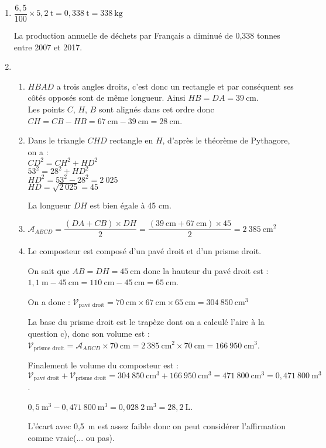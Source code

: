 
\begin{enumerate}[itemsep=1em]
	\item $\dfrac{6,5}{100}\times5,2~\text{t} = 0,338~\text{t} = 338~\text{kg}$
	
	\medskip
	La production annuelle de déchets par Français a diminué de 0,338 tonnes entre 2007 et 2017.
	
	\item 
	
	\begin{enumerate}[itemsep=1em]
	  	\item $HBAD$ a trois angles droits, c'est donc un rectangle et par conséquent ses côtés opposés sont de même longueur. Ainsi $HB = DA = 39~\text{cm}$.\\
	  	      Les points $C$, $H$, $B$ sont alignés dans cet ordre donc $CH=CB-HB=67~\text{cm}-39~\text{cm}=28~\text{cm}$.
	  	
	  	\item Dans le triangle $CHD$ rectangle en $H$, d'après le théorème de Pythagore, on a : \\
	  	      $CD^2=CH^2+HD^2$\\
	  	      $53^2=28^2+HD^2$\\
	  	      $HD^2=53^2-28^2=2~025$\\
	  	      $HD=\sqrt{2~025}=45$
	  	     
	  	      \medskip
	  	      La longueur $DH$ est bien égale à 45 cm.
	  	
	  	\item $\mathcal{A}_{ABCD}=\dfrac{(DA+CB)\times DH}{2}= \dfrac{(39~\text{cm}+67~\text{cm})\times45}{2}=2~385~\text{cm}^2$
	  	
	  	\item Le composteur est composé d'un pavé droit et d'un prisme droit.
	  	
	  	\medskip
	  	On sait que $AB=DH=45~\text{cm}$ donc la hauteur du pavé droit est :\\ $1,1~\text{m}-45~\text{cm}=110~\text{cm}-45~\text{cm}=65~\text{cm}$.
	  	
	  	\medskip
	  	On a donc : $\mathcal{V}_\text{pavé droit}=70~\text{cm}\times67~\text{cm}\times65~\text{cm}=304~850~\text{cm}^3$
	  	
	  	\medskip
	  	La base du prisme droit est le trapèze dont on a calculé l'aire à la question c), donc son volume est : $\mathcal{V}_\text{prisme droit}=\mathcal{A}_{ABCD}\times70~\text{cm}=2~385~\text{cm}^2\times70~\text{cm}=166~950~\text{cm}^3$.
	  	
	  	\medskip
	  	Finalement le volume du composteur est :\\ $\mathcal{V}_\text{pavé droit}+\mathcal{V}_\text{prisme droit} = 304~850~\text{cm}^3 + 166~950~\text{cm}^3 = 471~800~\text{cm}^3= 0,471~800~\text{m}^3 $.
	  	
	  	\medskip
	  	$0,5~\text{m}^3-0,471~800~\text{m}^3=0,028~2~\text{m}^3=28,2~\text{L}$.
	  	
	  	\medskip
	  	L'écart avec 0,5~m est assez faible donc on peut considérer l'affirmation comme vraie(... ou pas).
	  \end{enumerate}

\end{enumerate}

